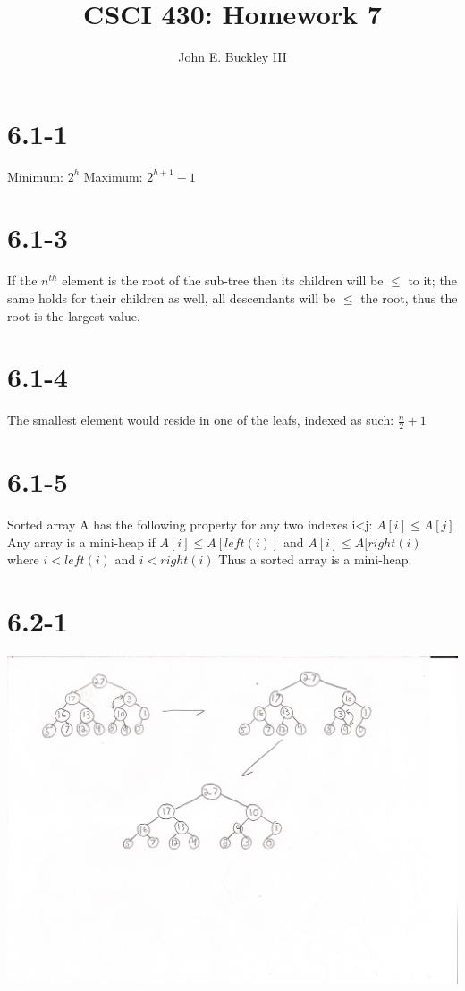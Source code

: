 \documentclass[12pt]{article}
\author{John E. Buckley III}
\title{CSCI 430: Homework 7}
\begin{document}
\maketitle

\section{6.1-1}
Minimum: $2^h$ \newline
Maximum: $2^{h+1}-1$

\section{6.1-3}
If the $n^{th}$ element is the root of the sub-tree then its children will be $\leq$ to it; the same holds for their children as well, all descendants will be $\leq$ the root, thus the root is the largest value.

\section{6.1-4}
The smallest element would reside in one of the leafs, indexed as such: $\frac{n}{2}+1$

\section{6.1-5}
Sorted array A has the following property for any two indexes i<j: $A[i]\leq A[j]$ \newline
Any array is a mini-heap if $A[i]\leq A[left(i)]$ and $A[i]\leq A[right(i)$ where $i<left(i)$ and $i<right(i)$ \newline 
Thus a sorted array is a mini-heap.

\section{6.2-1}
\includegraphics[scale=.5]{blah.jpg}
\end{document}
